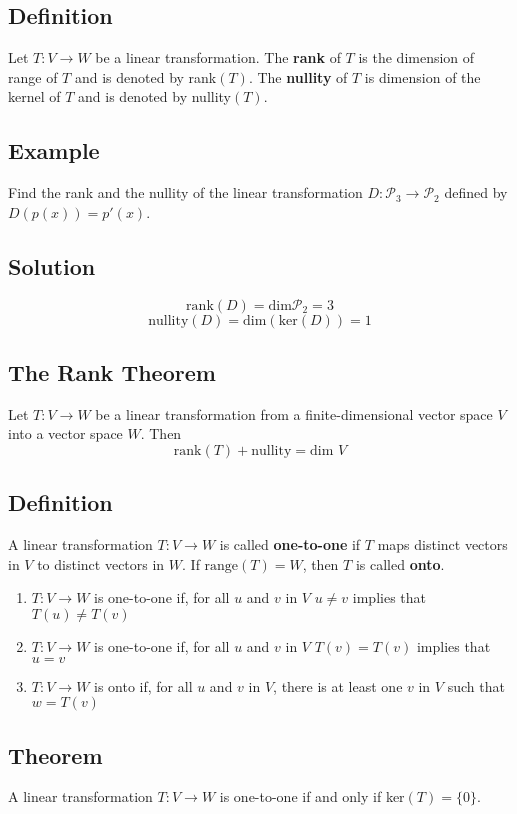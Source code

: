 \subsection*{Definition}
Let $T: V\to W$ be a linear transformation. The \textbf{rank} of $T$ is the
dimension of range of $T$ and is denoted by rank$(T)$. The \textbf{nullity} of
$T$ is dimension of the kernel of $T$ and is denoted by nullity$(T)$.

\subsection*{Example}
Find the rank and the nullity of the linear transformation $D:\mathscr{P}_3\to\mathscr{P}_2$
defined by $D(p(x)) = p'(x)$.

\subsection*{Solution}
\[\text{rank}(D)=\text{dim}\mathscr{P}_2=3\]
\[\text{nullity}(D)=\text{dim}(\text{ker}(D))=1\]

\subsection*{The Rank Theorem}
Let $T: V\to W$ be a linear transformation from a finite-dimensional vector space
$V$ into a vector space $W$. Then
\[\text{rank}(T)+\text{nullity}=\text{dim }V\]

\subsection*{Definition}
A linear transformation $T: V\to W$ is called \textbf{one-to-one} if $T$ maps
distinct vectors in $V$ to distinct vectors in $W$. If $\text{range}(T) = W$,
then $T$ is called \textbf{onto}.
\begin{enumerate}
    \item $T: V\to W$ is one-to-one if, for all $u$ and $v$ in $V$ $u\neq v$ implies that $T(u)\neq T(v)$
    \item $T: V\to W$ is one-to-one if, for all $u$ and $v$ in $V$ $T(v)=T(v)$ implies that $u=v$
    \item $T: V\to W$ is onto if, for all $u$ and $v$ in $V$, there is at least one $v$ in $V$ such that $w=T(v)$
\end{enumerate}

\subsection*{Theorem}
A linear transformation $T: V\to W$ is one-to-one if and only if ker$(T) = \{0\}$.

